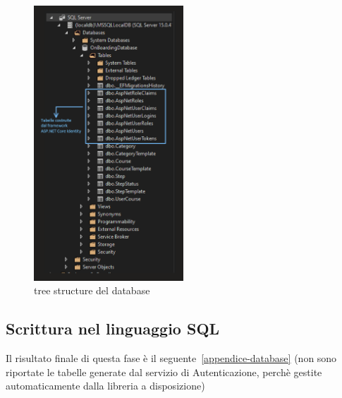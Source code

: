 \begin{figure}[H]
	\centering
	\includegraphics[width=0.5\textwidth]{img/TreeStructureDatabase.png}
	\caption{tree structure del database}
	\label{fig:TreeStructureDatabase}
\end{figure}
%
\subsection{Scrittura nel linguaggio SQL}
Il risultato finale di questa fase è il seguente~\ref{appendice-database} (non sono riportate le tabelle
generate dal servizio di Autenticazione, perchè gestite automaticamente dalla
libreria a disposizione)
%
